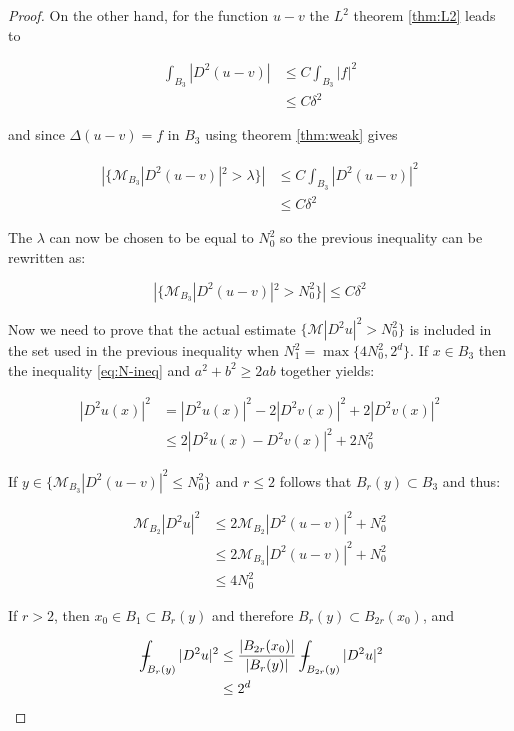 \documentclass[12pt]{artikel1}
\begin{document}
\begin{proof}
\noindent On the other hand, for the function $u-v$ the $L^2$ theorem \ref{thm:L2} leads to

\begin{align*}
    \int_{B_3}|D^2(u-v)|&\leq C\int_{B_3}|f|^2\\
    &\leq C\delta^2
\end{align*}

\noindent and since $\Delta(u-v)=f$ in $B_3$ using theorem \ref{thm:weak} gives 
    
\begin{align*}
    |\{\mathcal{M}_{B_3}|D^2(u-v)|^2>\lambda\}|&\leq C\int_{B_3}|D^2(u-v)|^2 \\
    &\leq C\delta^2
\end{align*}

\noindent The $\lambda$ can now be chosen to be equal to $N_0^2$ so the previous inequality can be rewritten as:

\begin{equation*}
    |\{\mathcal{M}_{B_3}|D^2(u-v)|^2>N_0^2\}|\leq C\delta^2
\end{equation*}

\noindent Now we need to prove that the actual estimate $\{\mathcal{M}|D^2u|^2>N^2_0\}$ is included in the set used in the previous inequality when $N_1^2=\max{\{4N^2_0,2^d\}}$. If $x\in B_3$ then the inequality \ref{eq:N-ineq} and $a^2+b^2\geq2ab$ together yields:

\begin{align*}
    |D^2u(x)|^2&=|D^2u(x)|^2-2|D^2v(x)|^2+2|D^2v(x)|^2 \\
    &\leq 2|D^2u(x)-D^2v(x)|^2+2N_0^2
\end{align*}

\noindent If $y\in\{\mathcal{M}_{B_3}|D^2(u-v)|^2\leq N^2_0\}$ and $r\leq2$ follows that $B_r(y)\subset B_3$ and thus:

\begin{align*}
    \mathcal{M}_{B_2}|D^2u|^2&\leq2\mathcal{M}_{B_2}|D^2(u-v)|^2+N_0^2 \\
    &\leq2\mathcal{M}_{B_3}|D^2(u-v)|^2+N_0^2 \\
    &\leq4N_0^2
\end{align*}

\noindent If $r>2$, then $x_0\in B_1\subset B_r(y)$ and therefore $B_r(y)\subset B_{2r}(x_0)$, and

\begin{align*}
    \intavg_{B_r(y)}|D^2u|^2&\leq\frac{|B_{2r}(x_0)|}{|B_r(y)|}\intavg_{B_{2r}(y)}|D^2u|^2 \\
    &\leq2^d
\end{align*}


\end{proof}
\end{document}
